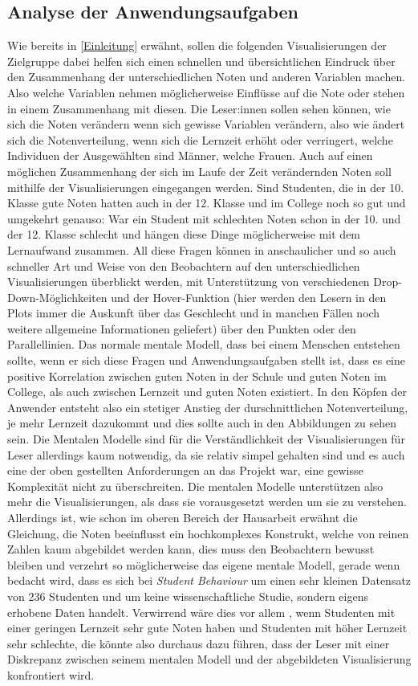 \documentclass[usegeometry=true]{scrartcl}
\begin{document}
\subsection{Analyse der Anwendungsaufgaben}
Wie bereits in \ref{Einleitung} erwähnt, sollen die folgenden Visualisierungen der Zielgruppe dabei helfen sich einen schnellen und übersichtlichen Eindruck über den Zusammenhang der unterschiedlichen Noten und anderen Variablen machen. Also welche Variablen nehmen möglicherweise Einflüsse auf die Note oder stehen in einem Zusammenhang mit diesen. 
Die Leser:innen  sollen sehen können, wie sich die Noten verändern wenn sich gewisse Variablen verändern, also wie ändert sich die Notenverteilung, wenn sich die Lernzeit erhöht oder verringert, welche Individuen der Ausgewählten sind Männer, welche Frauen. Auch auf einen möglichen Zusammenhang der sich im Laufe der Zeit verändernden Noten soll mithilfe der Visualisierungen eingegangen werden. Sind Studenten, die in der 10. Klasse gute Noten hatten auch in der 12. Klasse und im College noch so gut und umgekehrt genauso: War ein Student mit schlechten Noten schon in der 10. und der 12. Klasse schlecht und hängen diese Dinge möglicherweise mit dem Lernaufwand zusammen. All diese Fragen können in anschaulicher und so auch schneller Art und Weise von den Beobachtern auf den unterschiedlichen Visualisierungen überblickt werden, mit Unterstützung von verschiedenen Drop-Down-Möglichkeiten und der Hover-Funktion (hier werden den Lesern in den Plots immer die Auskunft über das Geschlecht und in manchen Fällen noch weitere allgemeine Informationen geliefert) über den Punkten oder den Parallellinien.
Das normale mentale Modell, dass bei einem Menschen entstehen sollte, wenn er sich diese Fragen und Anwendungsaufgaben stellt ist, dass es eine positive Korrelation zwischen guten Noten in der Schule und guten Noten im College, als auch zwischen Lernzeit und guten Noten existiert. In den Köpfen der Anwender entsteht also ein stetiger Anstieg der durschnittlichen Notenverteilung, je mehr Lernzeit dazukommt und dies sollte auch in den Abbildungen zu sehen sein. Die Mentalen Modelle sind für die Verständlichkeit der Visualisierungen für Leser allerdings  kaum notwendig, da sie relativ simpel gehalten sind und es auch eine der oben gestellten Anforderungen an das Projekt war, eine gewisse Komplexität nicht zu überschreiten. Die mentalen Modelle unterstützen also mehr die Visualisierungen, als dass sie vorausgesetzt werden um sie zu verstehen.
Allerdings ist, wie schon im oberen Bereich der Hausarbeit erwähnt die Gleichung, die Noten beeinflusst ein hochkomplexes Konstrukt, welche von reinen Zahlen kaum abgebildet werden kann, dies muss den Beobachtern bewusst bleiben und verzehrt so möglicherweise das eigene mentale Modell, gerade wenn bedacht wird, dass es sich bei \textit{Student Behaviour} um einen sehr kleinen Datensatz von 236 Studenten und um keine wissenschaftliche Studie, sondern eigens erhobene Daten handelt. Verwirrend wäre dies vor allem , wenn Studenten mit einer geringen Lernzeit sehr gute Noten haben und Studenten mit höher Lernzeit sehr schlechte, die könnte also durchaus dazu führen, dass der Leser mit einer Diskrepanz zwischen seinem mentalen Modell und der abgebildeten Visualisierung konfrontiert wird.
\end{document}
